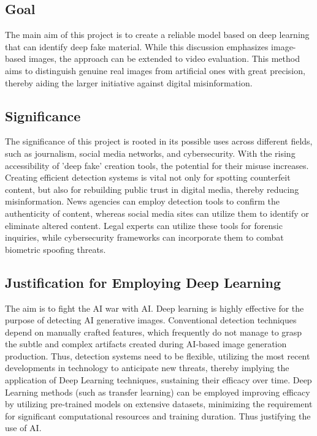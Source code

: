 \documentclass{article} %
\begin{document}
\subsection{Goal}
The main aim of this project is to create a reliable model based on deep learning that can identify deep fake material. While this discussion emphasizes image-based images, the approach can be extended to video evaluation. 
This method aims to distinguish genuine real images from artificial ones with great precision, thereby aiding the larger initiative against digital misinformation. 

\subsection{Significance}
The significance of this project is rooted in its possible uses across different fields, such as journalism, social media networks, and cybersecurity. With the rising accessibility of 'deep fake' creation tools, the potential for their misuse increases. Creating efficient detection systems is vital not only for spotting counterfeit content, but also for rebuilding public trust in digital media, thereby reducing misinformation. News agencies can employ detection tools to confirm the authenticity of content, whereas social media sites can utilize them to identify or eliminate altered content. Legal experts can utilize these tools for forensic inquiries, while cybersecurity frameworks can incorporate them to combat biometric spoofing threats.

\subsection{Justification for Employing Deep Learning}
The aim is to fight the AI war with AI. Deep learning is highly effective for the purpose of detecting AI generative images. Conventional detection techniques depend on manually crafted features, which frequently do not manage to grasp the subtle and complex artifacts created during AI-based image generation production. Thus, detection systems need to be flexible, utilizing the most recent developments in technology to anticipate new threats, thereby implying the application of Deep Learning techniques, sustaining their efficacy over time. Deep Learning methods (such as transfer learning) can be employed improving efficacy by utilizing pre-trained models on extensive datasets, minimizing the requirement for significant computational resources and training duration. Thus justifying the use of AI.
\end{document}
